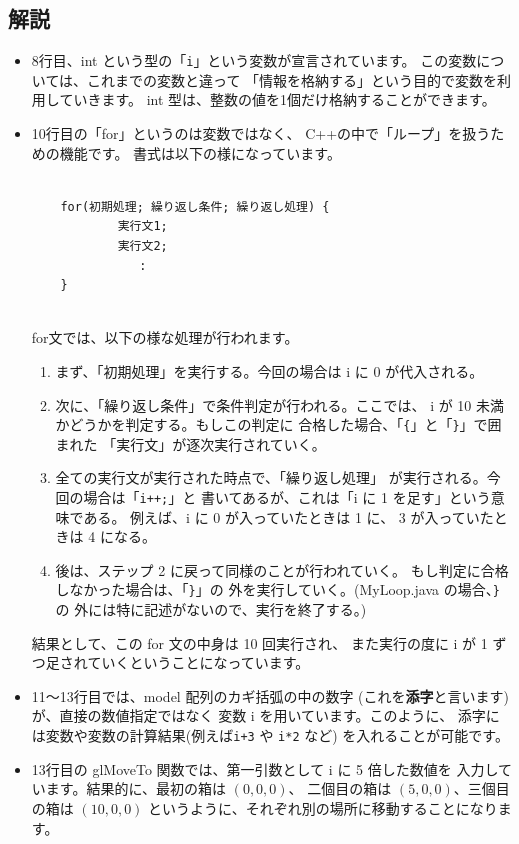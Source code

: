 \subsection*{解説}
\begin{itemize}
 \item 8行目、int という型の「\verb+i+」という変数が宣言されています。
	この変数については、これまでの変数と違って
	「情報を格納する」という目的で変数を利用していきます。
	int 型は、整数の値を1個だけ格納することができます。

 \item 10行目の「for」というのは変数ではなく、
	C++の中で「ループ」を扱うための機能です。
	書式は以下の様になっています。\\ ~ \\
	\begin{shadebox}
	\begin{verbatim}
	for(初期処理; 繰り返し条件; 繰り返し処理) {
	        実行文1;
	        実行文2;
	           :
	}
	\end{verbatim}
	\end{shadebox} ~ \\
	for文では、以下の様な処理が行われます。
	\begin{enumerate}
	\item まず、「初期処理」を実行する。今回の場合は
		i に 0 が代入される。
	\item 次に、「繰り返し条件」で条件判定が行われる。ここでは、
		i が 10 未満かどうかを判定する。もしこの判定に
		合格した場合、「\verb+{+」と「\verb+}+」で囲まれた
		「実行文」が逐次実行されていく。
	\item 全ての実行文が実行された時点で、「繰り返し処理」
		が実行される。今回の場合は「\verb-i++;-」と
		書いてあるが、これは「i に 1 を足す」という意味である。
		例えば、i に 0 が入っていたときは 1 に、
		3 が入っていたときは 4 になる。
	\item 後は、ステップ 2 に戻って同様のことが行われていく。
		もし判定に合格しなかった場合は、「\verb+}+」の
		外を実行していく。(MyLoop.java の場合、\verb+}+ の
		外には特に記述がないので、実行を終了する。)
	\end{enumerate}
	結果として、この for 文の中身は 10 回実行され、
	また実行の度に i が 1 ずつ足されていくということになっています。

 \item 11〜13行目では、model 配列のカギ括弧の中の数字
	(これを\textbf{添字}と言います)が、直接の数値指定ではなく
	変数 i を用いています。このように、
	添字には変数や変数の計算結果(例えば\verb-i+3- や \verb+i*2+ など)
	を入れることが可能です。

 \item 13行目の glMoveTo 関数では、第一引数として i に 5 倍した数値を
	入力しています。結果的に、最初の箱は \((0, 0, 0)\)、
	二個目の箱は \((5, 0, 0)\)、三個目の箱は \((10, 0, 0)\)
	というように、それぞれ別の場所に移動することになります。

\end{itemize}
\newpage
